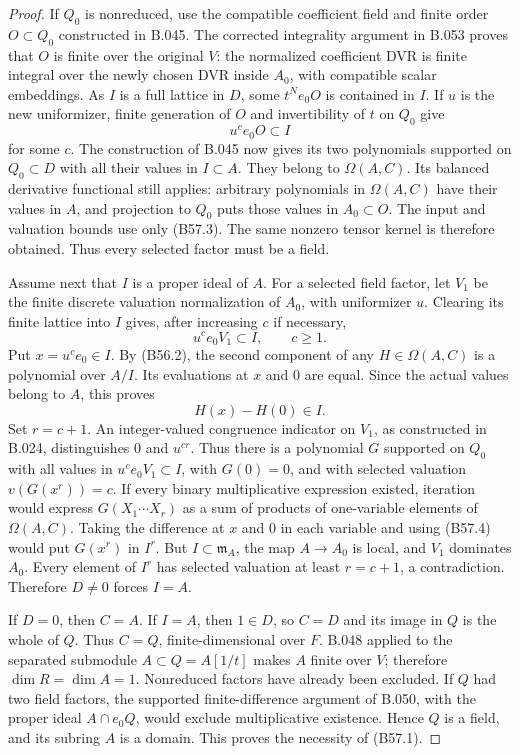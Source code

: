 \begin{proof}
If $Q_0$ is nonreduced, use the compatible
coefficient field and finite order $O\subset Q_0$
constructed in B.045. The corrected integrality
argument in B.053 proves that $O$ is finite over
the original $V$: the normalized coefficient DVR
is finite integral over the newly chosen DVR
inside $A_0$, with compatible scalar embeddings.
As $I$ is a full lattice in $D$, some $t^N e_0O$
is contained in $I$. If $u$ is the new uniformizer,
finite generation of $O$ and invertibility of
$t$ on $Q_0$ give
\[
                              u^ce_0O\subset I             \tag{B57.3}
\]
for some $c$. The construction of B.045 now gives
its two polynomials supported on $Q_0\subset D$
with all their values in $I\subset A$.
They belong to $\Omega(A,C)$. Its balanced
derivative functional still applies: arbitrary
polynomials in $\Omega(A,C)$ have their values
in $A$, and projection to $Q_0$ puts those values
in $A_0\subset O$. The input and valuation
bounds use only (B57.3). The same nonzero tensor
kernel is therefore obtained. Thus every selected
factor must be a field.

Assume next that $I$ is a proper ideal of $A$.
For a selected field factor, let $V_1$ be the
finite discrete valuation normalization of $A_0$,
with uniformizer $u$. Clearing its finite lattice
into $I$ gives, after increasing $c$ if necessary,
\[
                     u^ce_0V_1\subset I,\qquad c\ge1.
\]
Put $x=u^ce_0\in I$. By (B56.2), the second
component of any $H\in\Omega(A,C)$ is a
polynomial over $A/I$. Its evaluations at $x$
and $0$ are equal. Since the actual values belong
to $A$, this proves
\[
                         H(x)-H(0)\in I.                 \tag{B57.4}
\]
Set $r=c+1$. An integer-valued congruence indicator
on $V_1$, as constructed in B.024, distinguishes
$0$ and $u^{cr}$. Thus there is a polynomial
$G$ supported on $Q_0$ with all values in
$u^ce_0V_1\subset I$, with $G(0)=0$, and with
selected valuation $v(G(x^r))=c$.
If every binary multiplicative expression existed,
iteration would express $G(X_1\cdots X_r)$ as
a sum of products of one-variable elements of
$\Omega(A,C)$. Taking the difference at $x$ and
$0$ in each variable and using (B57.4) would
put $G(x^r)$ in $I^r$. But $I\subset\mathfrak m_A$,
the map $A\to A_0$ is local, and $V_1$ dominates
$A_0$. Every element of $I^r$ has selected
valuation at least $r=c+1$, a contradiction.
Therefore $D\ne0$ forces $I=A$.

If $D=0$, then $C=A$. If $I=A$, then $1\in D$,
so $C=D$ and its image in $Q$ is the whole of
$Q$. Thus $C=Q$, finite-dimensional over $F$.
B.048 applied to the separated submodule
$A\subset Q=A[1/t]$ makes $A$ finite over $V$;
therefore $\dim R=\dim A=1$.
Nonreduced factors have already been excluded.
If $Q$ had two field factors, the supported
finite-difference argument of B.050, with the
proper ideal $A\cap e_0Q$, would exclude
multiplicative existence. Hence $Q$ is a field,
and its subring $A$ is a domain. This proves
the necessity of (B57.1).


\end{proof}
